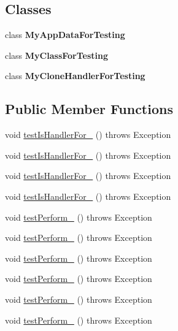\subsection*{Classes}
\begin{DoxyCompactItemize}
\item 
class {\bfseries My\-App\-Data\-For\-Testing}
\item 
class {\bfseries My\-Class\-For\-Testing}
\item 
class {\bfseries My\-Clone\-Handler\-For\-Testing}
\end{DoxyCompactItemize}
\subsection*{Public Member Functions}
\begin{DoxyCompactItemize}
\item 
void \hyperlink{classorg_1_1jgap_1_1impl_1_1_default_clone_handler_test_a2cd8fd4891fa24c77c21736cb209e51f}{test\-Is\-Handler\-For\-\_} ()  throws Exception 
\item 
void \hyperlink{classorg_1_1jgap_1_1impl_1_1_default_clone_handler_test_afbfdc42c1bbe80b2a2abe3f2fbe4e610}{test\-Is\-Handler\-For\-\_} ()  throws Exception 
\item 
void \hyperlink{classorg_1_1jgap_1_1impl_1_1_default_clone_handler_test_a96cae263d2680a04beae6c986da7f467}{test\-Is\-Handler\-For\-\_} ()  throws Exception 
\item 
void \hyperlink{classorg_1_1jgap_1_1impl_1_1_default_clone_handler_test_a179a482c1af5c5fb9d459c8a1873b81d}{test\-Is\-Handler\-For\-\_} ()  throws Exception 
\item 
void \hyperlink{classorg_1_1jgap_1_1impl_1_1_default_clone_handler_test_a7bf4ce48eefd1f4478a058709a1547d8}{test\-Perform\-\_} ()  throws Exception 
\item 
void \hyperlink{classorg_1_1jgap_1_1impl_1_1_default_clone_handler_test_a4cb16a46cc0e965beaded166b79d530d}{test\-Perform\-\_} ()  throws Exception 
\item 
void \hyperlink{classorg_1_1jgap_1_1impl_1_1_default_clone_handler_test_a3c4e6b78ef40a97c7a902df60e23502b}{test\-Perform\-\_} ()  throws Exception 
\item 
void \hyperlink{classorg_1_1jgap_1_1impl_1_1_default_clone_handler_test_a21365d7baf9c2a53394c08bdd59c9ae5}{test\-Perform\-\_} ()  throws Exception 
\item 
void \hyperlink{classorg_1_1jgap_1_1impl_1_1_default_clone_handler_test_a541b4945f6f3f4d782e57d319d7d320d}{test\-Perform\-\_} ()  throws Exception 
\item 
void \hyperlink{classorg_1_1jgap_1_1impl_1_1_default_clone_handler_test_aef4aea5db7513ca7902bf2dbbe51cf25}{test\-Perform\-\_} ()  throws Exception 
\end{DoxyCompactItemize}
